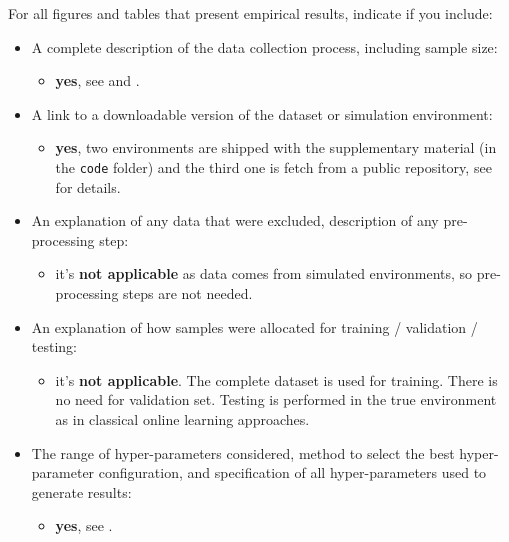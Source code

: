 For all figures and tables that present empirical results, indicate if you include:

\begin{itemize}
    \item A complete description of the data collection process, including sample size: 
    
        \begin{itemize}
            \item\textbf{yes}, see  and .
        \end{itemize}
    \item A link to a downloadable version of the dataset or simulation environment:
    
        \begin{itemize}
            \item  \textbf{yes}, two environments   are shipped with the supplementary material (in the \texttt{code} folder) and the third one is fetch from a public repository, see  for details.
        \end{itemize}
    \item An explanation of any data that were excluded, description of any pre-processing step: 
        \begin{itemize}
            \item it's \textbf{not applicable} as data comes from simulated environments, so pre-processing steps are not needed.
        \end{itemize}

    \item An explanation of how samples were allocated for training / validation / testing: 
        \begin{itemize}
            \item it's \textbf{not applicable}. The complete dataset is used for training. There is no need for validation set. Testing is performed in the true environment as in classical online learning approaches.
        \end{itemize}

    \item The range of hyper-parameters considered, method to select the best hyper-parameter configuration, and specification of all hyper-parameters used to generate results: 
    
        \begin{itemize}
            \item \textbf{yes}, see .
        \end{itemize}


\end{itemize}
